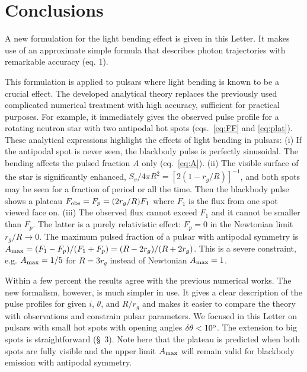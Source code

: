 \documentclass{article}
\def\Am{A_{\rm max}}
\def\Fobs{F_{\rm obs}}
\def\dg{{\rm o}}
\begin{document}
\section{Conclusions}


A new formulation for the light bending effect is given in this Letter.
It makes use of an approximate simple formula that describes photon 
trajectories with remarkable accuracy (eq. 1).

This formulation is applied to pulsars where light bending is 
known to be a crucial effect. The developed analytical theory
replaces the previously used complicated numerical treatment with 
high accuracy, sufficient for practical purposes. For example, it immediately
gives the observed pulse profile for a rotating neutron star with 
two antipodal hot spots (eqs.~\ref{eq:FF} and \ref{eq:plat}). 
These analytical expressions highlight the effects of light bending
in pulsars:
(i) If the antipodal spot is never seen, the blackbody pulse is perfectly
sinusoidal. The bending affects the pulsed fraction $A$ only (eq.~\ref{eq:A}). 
(ii) The visible surface of the star is significantly enhanced, 
$S_v/4\pi R^2=[2(1-r_g/R)]^{-1}$, and both spots may be seen for a fraction 
of period or all the time. Then the blackbody pulse shows a plateau 
$\Fobs=F_p=(2r_g/R)F_1$ where $F_1$ is the flux from one spot viewed face on. 
(iii) The observed flux cannot exceed $F_1$ and it cannot be smaller 
than $F_p$. The latter is a purely relativistic effect: $F_p=0$ in the
Newtonian limit $r_g/R\rightarrow 0$. The maximum pulsed fraction of a pulsar 
with antipodal symmetry is $\Am=(F_1-F_p)/(F_1+F_p)=(R-2r_g)/(R+2r_g)$. This 
is a severe constraint, e.g. $\Am=1/5$ for $R=3r_g$ instead of Newtonian 
$\Am=1$.  

Within a few percent the results agree with the previous numerical works. 
The new formalism, however, is much simpler in use. It gives a clear description 
of the pulse profiles for given $i$, $\theta$, and $R/r_g$ and makes it easier 
to compare the theory with observations and constrain pulsar parameters.
We focused in this Letter on pulsars with small hot spots with opening 
angles $\delta\theta<10^\dg$. The extension to big spots is straightforward 
(\S~3). Note here that the plateau is predicted when both spots are fully 
visible and the upper limit $\Am$ will remain valid for blackbody emission 
with antipodal symmetry.
\end{document}
